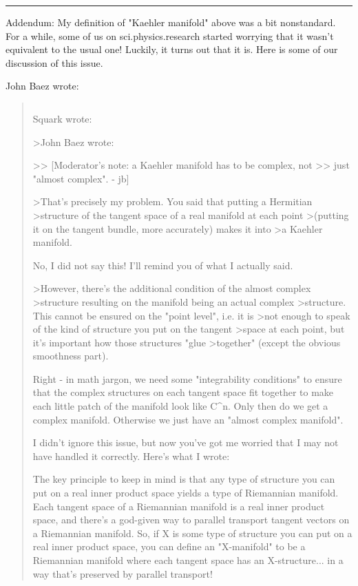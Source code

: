 \par\noindent\rule{\textwidth}{0.4pt}
Addendum: My definition of "Kaehler manifold" above was a bit
nonstandard.  For a while, some of us on sci.physics.research
started worrying that it wasn't equivalent to the usual one!  Luckily,
it turns out that it is.  Here is some of our discussion of this issue.

John Baez wrote:

\begin{quote}

$$

Squark wrote:

>John Baez wrote:

>> [Moderator's note: a Kaehler manifold has to be complex, not
>> just "almost complex". - jb]  

>That's precisely my problem. You said that putting a Hermitian
>structure of the tangent space of a real manifold at each point
>(putting it on the tangent bundle, more accurately) makes it into
>a Kaehler manifold.

No, I did not say this!  I'll remind you of what I actually said.

>However, there's the additional condition of the almost complex
>structure resulting on the manifold being an actual complex
>structure. This cannot be ensured on the "point level", i.e. it is
>not enough to speak of the kind of structure you put on the tangent
>space at each point, but it's important how those structures "glue
>together" (except the obvious smoothness part).

Right - in math jargon, we need some "integrability conditions"
to ensure that the complex structures on each tangent space fit
together to make each little patch of the manifold look like C^n.
Only then do we get a complex manifold.  Otherwise we just have
an "almost complex manifold".  

I didn't ignore this issue, but now you've got me worried
that I may not have handled it correctly.  Here's what I wrote:

  The key principle to keep in mind is that any type of structure you
  can put on a real inner product space yields a type of Riemannian 
  manifold.  Each tangent space of a Riemannian manifold is a real
  inner product space, and there's a god-given way to parallel
  transport tangent vectors on a Riemannian manifold.  So, if X is
  some type of structure you can put on a real inner product space,
  you can define an "X-manifold" to be a Riemannian manifold where each
  tangent space has an X-structure...  in a way that's preserved by
  parallel transport!


\end{quote}
